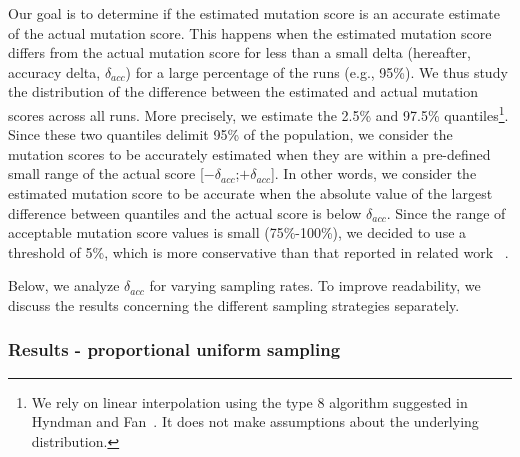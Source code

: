 %

%
Our goal is to determine if the estimated mutation score is an accurate estimate of the actual mutation score.
This happens when the estimated mutation score differs from the actual mutation score for less than a small delta (hereafter, accuracy delta, $\delta_{acc}$) for a large percentage of the runs (e.g., 95\%).
We thus study the distribution of the difference between the estimated and actual mutation scores across all runs. More precisely, we estimate the 2.5\% and 97.5\% quantiles\footnote{We rely on linear interpolation using the type 8
algorithm suggested in Hyndman and Fan~\cite{Hyndman1996}. It does not make assumptions about the underlying distribution.}.
Since these two quantiles delimit 95\% of the population,
we consider the mutation scores to be accurately estimated when they are within a pre-defined small range of the actual score [$-\delta_{acc}$;$+\delta_{acc}$].
In other words, we consider the estimated mutation score to be accurate when
the absolute value of the largest difference between quantiles and the actual score is below $\delta_{acc}$.
Since the range of acceptable mutation score values is small (75\%-100\%), we decided to use a threshold of 5\%, which is more conservative than that reported in related work ~\cite{gopinath2015hard}.

Below, we analyze $\delta_{acc}$ for varying sampling rates. To improve readability, we discuss the results concerning the different sampling strategies separately.




\subsubsection{Results - proportional uniform sampling}

